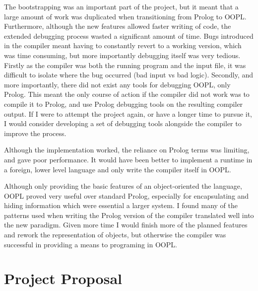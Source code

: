 \documentclass[12pt,a4paper,twoside,openright]{report}
\begin{document}
\bigskip

The bootstrapping was an important part of the project, but it meant that a large amount of work was duplicated when transitioning from Prolog to OOPL. Furthermore, although the new features allowed faster writing of code, the extended debugging process wasted a significant amount of time. Bugs introduced in the compiler meant having to constantly revert to a working version, which was time consuming, but more importantly debugging itself was very tedious. Firstly as the compiler was both the running program and the input file, it was difficult to isolate where the bug occurred (bad input vs bad logic). Secondly, and more importantly, there did not exist any tools for debugging OOPL, only Prolog. This meant the only course of action if the compiler did not work was to compile it to Prolog, and use Prolog debugging tools on the resulting compiler output. If I were to attempt the project again, or have a longer time to pursue it, I would consider developing a set of debugging tools alongside the compiler to improve the process.

\bigskip

Although the implementation worked, the reliance on Prolog terms was limiting, and gave poor performance. It would have been better to implement a runtime in a foreign, lower level language and only write the compiler itself in OOPL.

\bigskip

Although only providing the basic features of an object-oriented the language, OOPL proved very useful over standard Prolog, especially for encapsulating and hiding information which were essential a larger system. I found many of the patterns used when writing the Prolog version of the compiler translated well into the new paradigm. Given more time I would finish more of the planned features and rework the representation of objects, but otherwise the compiler was successful in providing a means to programing in OOPL.

{}


\appendix


\chapter{Project Proposal}
\end{document}
